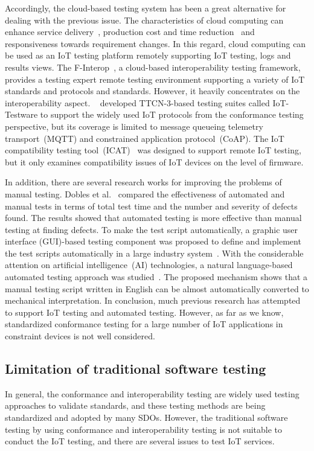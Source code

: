 Accordingly, the cloud-based testing system has been a great
alternative for dealing with the previous issue. The characteristics
of cloud computing can enhance service
delivery~\cite{testingInCloud2012}, production cost and time
reduction~\cite{taas2013} and responsiveness towards requirement  
changes. In this regard, cloud computing can be used as an IoT testing
platform remotely supporting IoT testing, logs and results views. The
F-Interop~\cite{fInteropImplementation2018}, a cloud-based
interoperability testing framework, 
provides a testing expert remote testing environment supporting a
variety of IoT standards and protocols and standards. However, it
heavily concentrates on the interoperability
aspect. ~\cite{IoTTestware2017} developed TTCN-3-based testing suites
called IoT-Testware to support the widely used IoT protocols from the
conformance testing perspective, but its 
coverage is limited to message queueing telemetry transport~(MQTT) and
constrained application protocol~(CoAP). The IoT compatibility testing
tool~(ICAT)~\cite{ICAT2018} was designed to support remote IoT testing, but it
only examines compatibility issues of IoT devices on the level of
firmware.

In addition, there are several research works for improving the
problems of manual testing. Dobles et al.~\cite{dobles2019comparing}
compared the effectiveness of automated and manual tests in terms of
total test time and the number and severity of defects found. The
results showed that automated testing is more effective than manual
testing at finding defects. To make the test script automatically, a
graphic user interface (GUI)-based testing component was proposed to
define and implement the test scripts automatically in a large
industry system~\cite{klammer2017journey}. With the considerable
attention on artificial intelligence~(AI) technologies, a natural
language-based automated testing approach was
studied~\cite{thummalapenta2012automating}. The proposed mechanism
shows that a manual testing script written in English can be almost
automatically converted to mechanical interpretation. In conclusion,
much previous research has attempted to support IoT testing and
automated testing. However, as far as we know, standardized
conformance testing for a large number of IoT applications in
constraint devices is not well considered.

\subsection{Limitation of traditional software testing}
In general, the conformance and interoperability testing are widely used testing approaches to validate standards, and these testing methods are being standardized and adopted by many SDOs. However, the traditional software testing by using conformance and interoperability testing is not suitable to conduct the IoT testing, and there are several issues to test IoT services.

